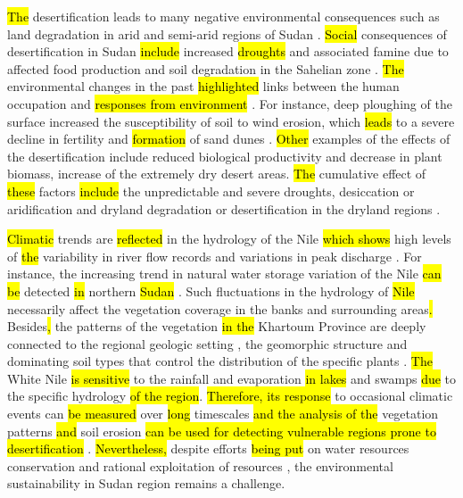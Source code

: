 \documentclass[jimaging,article,submit,pdftex,moreauthors]{Definitions/mdpi}
\begin{document}
\hl{The} desertification leads to many negative environmental consequences such as land degradation in arid and semi-arid regions of Sudan \cite{Khiry,ELNASHAR2022152925}. \hl{Social} consequences of desertification in Sudan \hl{include} increased \hl{droughts} and associated famine due to affected food production and soil degradation in the Sahelian zone\hl{ }\cite{Subramaniam}. \hl{The} environmental changes in the past\hl{ highlighted }links between the human occupation and \hl{responses from environment} \cite{HONEGGER2015141}. For instance, deep ploughing of the surface increased the susceptibility of soil to wind erosion, which \hl{leads} to a severe decline in fertility and \hl{formation} of sand dunes \cite{Abdi}. \hl{Other} examples of the effects of the desertification include reduced biological productivity \cite{KHALIFA2018790,Jahelnabi} and decrease in plant biomass, increase of the extremely dry desert areas. \hl{The} cumulative effect of \hl{these} factors \hl{include }the unpredictable and severe droughts, desiccation or aridification and dryland degradation or desertification in the dryland regions \cite{Darkoh}. 

\hl{Climatic} trends are \hl{reflected} in the hydrology of the Nile \hl{which shows} high levels of \hl{the }variability in river flow records \cite{CONWAY200599} and variations in peak discharge \cite{Babiker}. For instance, the increasing trend in natural water storage variation of the Nile \hl{can be} detected \hl{in }northern \hl{Sudan} \cite{ABDELMALIK2019103596}. Such fluctuations in the hydrology of \hl{Nile} necessarily affect the vegetation coverage in the banks and surrounding areas\hl{. }Besides\hl{, }the patterns of the vegetation \hl{in the} Khartoum Province are deeply connected to the regional geologic setting \cite{ELSHEIKH201182}, the geomorphic structure and dominating soil types that control the distribution of the specific plants \cite{Mahmoud}. \hl{The} White Nile \hl{is sensitive} to the rainfall and evaporation \hl{in lakes} and swamps \hl{due }to the specific hydrology \hl{of the region}. \hl{Therefore, its response }to occasional climatic events can \hl{be measured} over \hl{long }timescales \cite{Sene}\hl{ and the analysis of the} vegetation patterns \hl{and }soil erosion \hl{can be used for detecting vulnerable regions prone to desertification} \cite{Bakhit}. \hl{Nevertheless, }despite efforts \hl{being put }on water resources conservation and rational exploitation of resources \cite{MOHAMEDALI2003237,w10111579}, the environmental sustainability in Sudan region remains a challenge.
 
\end{document}
